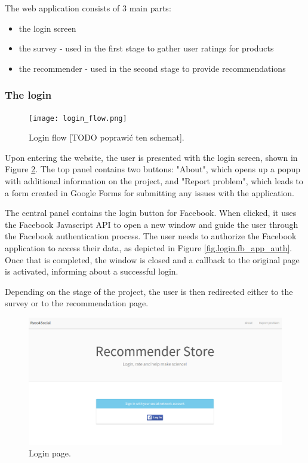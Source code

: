 \documentclass[12pt]{report}
\begin{document}
The web application consists of 3 main parts:
\begin{itemize}
\item the login screen
\item the survey - used in the first stage to gather user ratings for products
\item the recommender - used in the second stage to provide recommendations
\end{itemize}

\subsubsection{The login}

\begin{figure}[!h]
\centering
\texttt{[image: login\_flow.png]} 
\caption[Login flow.]{Login flow [TODO poprawić ten schemat].}
\label{fig.login_flow}
\end{figure}

Upon entering the website, the user is presented with the login screen, shown in Figure \ref{fig.login}. The top panel contains two buttons: "About", which opens up a popup with additional information on the project, and "Report problem", which leads to a form created in Google Forms for submitting any issues with the application.

The central panel contains the login button for Facebook. When clicked, it uses the Facebook Javascript API to open a new window and guide the user through the Facebook authentication process. The user needs to authorize the Facebook application to access their data, as depicted in Figure \ref{fig.login.fb_app_auth}. Once that is completed, the window is closed and a callback to the original page is activated, informing about a successful login.

Depending on the stage of the project, the user is then redirected either to the survey or to the recommendation page. 

\begin{figure}[!t]
\centering
\includegraphics[width=\textwidth]{reco4_login.png} 
\caption[Login page.]{Login page.}
\label{fig.login}
\end{figure}
\end{document}
